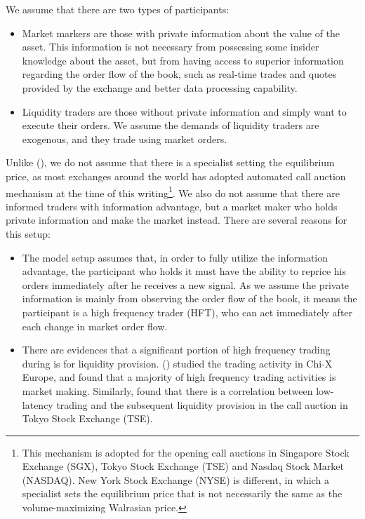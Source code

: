 We assume that there are two types of participants:

\begin{itemize}
  \item Market markers are those with private information about the value of the asset. This information is not necessary from possessing some insider knowledge about the asset, but from having access to superior information regarding the order flow of the book, such as real-time trades and quotes provided by the exchange and better data processing capability.
  \item Liquidity traders are those without private information and simply want to execute their orders. We assume the demands of liquidity traders are exogenous, and they trade using market orders.
\end{itemize}

Unlike (\cite{Madhavan2015}), we do not assume that there is a specialist setting the equilibrium price, as most exchanges around the world has adopted automated call auction mechanism at the time of this writing\footnote{This mechanism is adopted for the opening call auctions in Singapore Stock Exchange (SGX), Tokyo Stock Exchange (TSE) and Nasdaq Stock Market (NASDAQ). New York Stock Exchange (NYSE) is different, in which a specialist sets the equilibrium price that is not necessarily the same as the volume-maximizing Walrasian price.}. We also do not assume that there are informed traders with information advantage, but a market maker who holds private information and make the market instead. There are several reasons for this setup:
\begin{itemize}
  \item The model setup assumes that, in order to fully utilize the information advantage, the participant who holds it must have the ability to reprice his orders immediately after he receives a new signal. As we assume the private information is mainly from observing the order flow of the book, it means the participant is a high frequency trader (HFT), who can act immediately after each change in market order flow.
  \item There are evidences that a significant portion of high frequency trading during is for liquidity provision. (\cite{Menkveld2013}) studied the trading activity in Chi-X Europe, and found that a majority of high frequency trading activities is market making. Similarly, \cite{Bellia2017} found that there is a correlation between low-latency trading and the subsequent liquidity provision in the call auction in Tokyo Stock Exchange (TSE).
\end{itemize}

